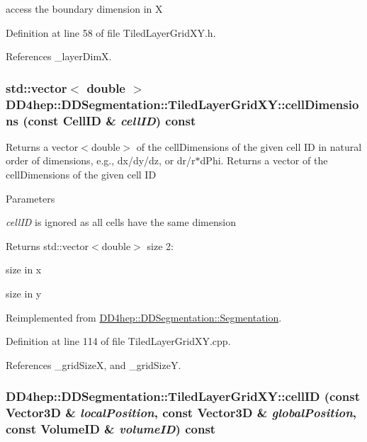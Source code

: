 access the boundary dimension in X 

Definition at line 58 of file TiledLayerGridXY.h.

References \_\-layerDimX.\hypertarget{class_d_d4hep_1_1_d_d_segmentation_1_1_tiled_layer_grid_x_y_a5304d34d8b7bb2eb0a187a595796de31}{
\subsubsection[{cellDimensions}]{\setlength{\rightskip}{0pt plus 5cm}std::vector$<$ double $>$ DD4hep::DDSegmentation::TiledLayerGridXY::cellDimensions (const {\bf CellID} \& {\em cellID}) const}}
\label{class_d_d4hep_1_1_d_d_segmentation_1_1_tiled_layer_grid_x_y_a5304d34d8b7bb2eb0a187a595796de31}


Returns a vector$<$double$>$ of the cellDimensions of the given cell ID in natural order of dimensions, e.g., dx/dy/dz, or dr/r$\ast$dPhi. Returns a vector of the cellDimensions of the given cell ID 
\begin{DoxyParams}{Parameters}
\item[{\em cellID}]is ignored as all cells have the same dimension \end{DoxyParams}
\begin{DoxyReturn}{Returns}
std::vector$<$double$>$ size 2:
\begin{DoxyEnumerate}
\item size in x
\item size in y 
\end{DoxyEnumerate}
\end{DoxyReturn}


Reimplemented from \hyperlink{class_d_d4hep_1_1_d_d_segmentation_1_1_segmentation_a9710f4942d7f6b52ae5342652e17c88d}{DD4hep::DDSegmentation::Segmentation}.

Definition at line 114 of file TiledLayerGridXY.cpp.

References \_\-gridSizeX, and \_\-gridSizeY.\hypertarget{class_d_d4hep_1_1_d_d_segmentation_1_1_tiled_layer_grid_x_y_a7b37dc7981a6f36fdc67bd2759af7bdb}{
\subsubsection[{cellID}]{ DD4hep::DDSegmentation::TiledLayerGridXY::cellID (const {\bf Vector3D} \& {\em localPosition}, \/  const {\bf Vector3D} \& {\em globalPosition}, \/  const {\bf VolumeID} \& {\em volumeID}) const}}
\label{class_d_d4hep_1_1_d_d_segmentation_1_1_tiled_layer_grid_x_y_a7b37dc7981a6f36fdc67bd2759af7bdb}


